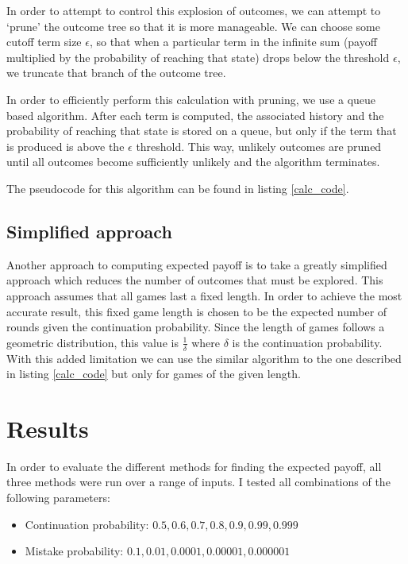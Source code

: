 \documentclass[a4paper,12pt]{article}
\begin{document}
In order to attempt to control this explosion of outcomes, we can attempt to `prune' the outcome tree so that it is more manageable.
We can choose some cutoff term size $\epsilon$, so that when a particular term in the infinite sum (payoff multiplied by the probability of reaching that state) drops below the threshold $\epsilon$, we truncate that branch of the outcome tree.

In order to efficiently perform this calculation with pruning, we use a queue based algorithm.
After each term is computed, the associated history and the probability of reaching that state is stored on a queue, but only if the term that is produced is above the $\epsilon$ threshold.
This way, unlikely outcomes are pruned until all outcomes become sufficiently unlikely and the algorithm terminates.

The pseudocode for this algorithm can be found in listing \ref{calc_code}.



\subsection{Simplified approach}

Another approach to computing expected payoff is to take a greatly simplified approach which reduces the number of outcomes that must be explored.
This approach assumes that all games last a fixed length.
In order to achieve the most accurate result, this fixed game length is chosen to be the expected number of rounds given the continuation probability.
Since the length of games follows a geometric distribution, this value is $\frac{1}{\delta}$ where $\delta$ is the continuation probability.
With this added limitation we can use the similar algorithm to the one described in listing \ref{calc_code} but only for games of the given length.

\section{Results}

In order to evaluate the different methods for finding the expected payoff, all three methods were run over a range of inputs.
I tested all combinations of the following parameters:

\begin{itemize}
    \item Continuation probability: $0.5, 0.6, 0.7, 0.8, 0.9, 0.99, 0.999$
    \item Mistake probability: $0.1, 0.01, 0.0001, 0.00001, 0.000001$
\end{itemize}
\end{document}
